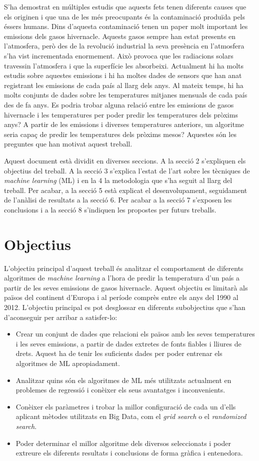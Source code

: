 \documentclass[10pt,a4paper,twocolumn,twoside]{article}
\begin{document}
S'ha demostrat en múltiples estudis que aquests fets tenen diferents causes que els originen i que una de les més preocupants és la contaminació produïda pels éssers humans. Dins d'aquesta contaminació tenen un paper molt important les emissions dels gasos hivernacle. Aquests gasos sempre han estat presents en l'atmosfera, però des de la revolució industrial la seva presència en l'atmosfera s'ha vist incrementada enormement. Això provoca que les radiacions solars travessin l'atmosfera i que la superfície les absorbeixi. Actualment hi ha molts estudis sobre aquestes emissions i hi ha moltes dades de sensors que han anat registrant les emissions de cada país al llarg dels anys. Al mateix temps, hi ha molts conjunts de dades sobre les temperatures mitjanes mensuals de cada país des de fa anys. Es podria trobar alguna relació entre les emissions de gasos hivernacle i les temperatures per poder predir les temperatures dels pròxims anys? A partir de les emissions i diverses temperatures anteriors, un algoritme seria capaç de predir les temperatures dels pròxims mesos? Aquestes són les preguntes que han motivat aquest treball.

Aquest document està dividit en diverses seccions. A la secció 2 s'expliquen els objectius del treball. A la  secció 3 s'explica l'estat de l'art sobre les tècniques de \textit{machine learning} (ML) i en la 4 la metodologia que s'ha seguit al llarg del treball. Per acabar, a la secció 5 està explicat el desenvolupament, seguidament de l'anàlisi de resultats a la secció 6. Per acabar a la secció 7 s'exposen les conclusions i a la secció 8 s'indiquen les propostes per futurs treballs.   
\section{Objectius}
L'objectiu principal d'aquest treball és analitzar el comportament de diferents algoritmes de \textit{machine learning} a l'hora de predir la temperatura d'un país a partir de les seves emissions de gasos hivernacle. Aquest objectiu es limitarà als països del continent d'Europa i al període comprès entre els anys del 1990 al 2012. L'objectiu principal es pot desglossar en diferents subobjectius que s'han d'aconseguir per arribar a satisfer-lo:
\begin{itemize}
\item Crear un conjunt de dades que relacioni els països amb les seves temperatures i les seves emissions, a partir de dades extretes de fonts fiables i lliures de drets. Aquest ha de tenir les suficients dades per poder entrenar els algoritmes de ML apropiadament.
\item Analitzar quins són els algoritmes de ML més utilitzats actualment en problemes de regressió i conèixer els seus avantatges i inconvenients.
\item Conèixer els paràmetres i trobar la millor configuració de cada un d'ells aplicant mètodes utilitzats en Big Data, com el \textit{grid search} o el \textit{randomized search}.
\item Poder determinar el millor algoritme dels diversos seleccionats i poder extreure els diferents resultats i conclusions de forma gràfica i entenedora.  
\end{itemize}
\end{document}
